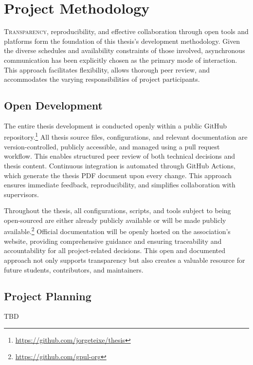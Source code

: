 %

\chapter{Project Methodology}
\label{chap:project-methodology}

\lettrine{T}{ransparency}, reproducibility, and effective collaboration through open tools and platforms form the foundation of this thesis's development methodology. Given the diverse schedules and availability constraints of those involved, asynchronous communication has been explicitly chosen as the primary mode of interaction. This approach facilitates flexibility, allows thorough peer review, and accommodates the varying responsibilities of project participants.

\section{Open Development}

The entire thesis development is conducted openly within a public GitHub repository.\footnote{\url{https://github.com/jorgeteixe/thesis}} All thesis source files, configurations, and relevant documentation are version-controlled, publicly accessible, and managed using a pull request workflow. This enables structured peer review of both technical decisions and thesis content. Continuous integration is automated through GitHub Actions, which generate the thesis PDF document upon every change. This approach ensures immediate feedback, reproducibility, and simplifies collaboration with supervisors.

Throughout the thesis, all configurations, scripts, and tools subject to being open-sourced are either already publicly available or will be made publicly available.\footnote{\url{https://github.com/gpul-org}} Official documentation will be openly hosted on the association's website, providing comprehensive guidance and ensuring traceability and accountability for all project-related decisions. This open and documented approach not only supports transparency but also creates a valuable resource for future students, contributors, and maintainers.

\section{Project Planning}

TBD
